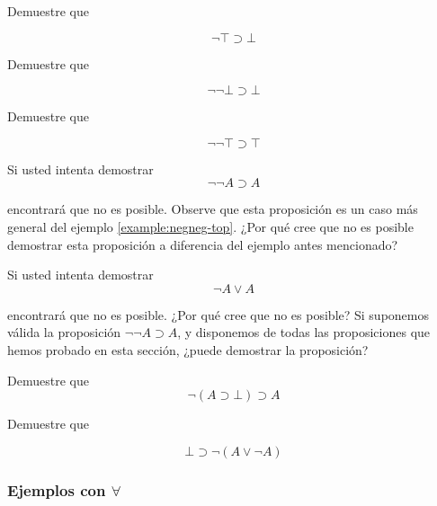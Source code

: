 \documentclass{article}
\begin{document}
\begin{example}
    Demuestre que

    $$
        \neg \top \supset \bot
    $$
\end{example}

\begin{exercise}
    Demuestre que

    $$
        \neg \neg \bot \supset \bot    
    $$
\end{exercise}

\begin{exercise}\label{example:negneg-top}
    Demuestre que

    $$
        \neg \neg \top \supset \top
    $$
\end{exercise}

\begin{exercise}
    Si usted intenta demostrar
    $$
        \neg \neg A \supset A
    $$

    encontrará que no es posible. Observe que esta proposición es un caso 
    más general del ejemplo \ref{example:negneg-top}. 
    ¿Por qué cree que no es posible demostrar esta proposición a diferencia del
    ejemplo antes mencionado?

\end{exercise}

\begin{exercise}
    Si usted intenta demostrar
    $$
        \neg A \lor A
    $$

    encontrará que no es posible. ¿Por qué cree que no es posible?
    Si suponemos válida la proposición $\neg \neg A \supset A$, y
    disponemos de todas las proposiciones que hemos probado en esta
    sección, ¿puede demostrar la proposición?
\end{exercise}

\begin{example}
    Demuestre que
    $$
        \neg (A \supset \bot) \supset A
    $$
\end{example}

\begin{exercise}
    Demuestre que

    $$
        \bot \supset \neg(A \lor \neg A)
    $$

\end{exercise}

\subsubsection{Ejemplos con $\forall$}
\end{document}
